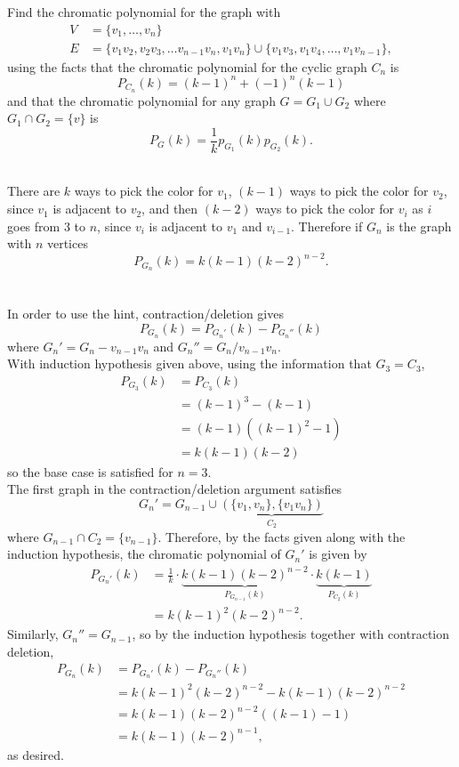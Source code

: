 \documentclass{article}
\newenvironment{problem}[2][Problem]{\begin{trivlist}
\item[\hskip \labelsep {\bfseries #1}\hskip \labelsep {\bfseries #2.}]}{\end{trivlist}}
\newenvironment{solution}[1][Solution.]{\begin{trivlist}
\item[\hskip \labelsep {\bfseries #1}]}{\end{trivlist}}
\newcommand{\set}[1]{\{ #1 \}}
\begin{document}
\begin{problem}{2}
  Find the chromatic polynomial for the graph with \begin{align*}
    V &= \set{v_1, \hdots, v_n} \\
    E &= \set{v_1 v_2, v_2v_3, \hdots v_{n-1}v_{n}, v_1v_n}
      \cup \set{v_1v_3, v_1v_4, \hdots, v_1v_{n-1}},
  \end{align*} using the facts that the chromatic polynomial for the cyclic
  graph $C_n$ is \[
    P_{C_n}(k) = (k-1)^n + (-1)^n(k-1)
  \] and that the chromatic polynomial for any graph $G = G_1 \cup G_2$ where
  $G_1 \cap G_2 = \set{v}$ is \[
    P_G(k) = \frac{1}{k}p_{G_1}(k)p_{G_2}(k).
  \]
\end{problem}

\begin{solution} \text{} \\
  There are $k$ ways
  to pick the color for $v_1$, $(k-1)$ ways to pick the color for $v_2$, since
  $v_1$ is adjacent to $v_2$, and then $(k-2)$ ways to pick the color for $v_i$
  as $i$ goes from $3$ to $n$, since $v_i$ is adjacent to $v_1$ and $v_{i-1}$.
  Therefore if $G_n$ is the graph with $n$ vertices \[
    P_{G_n}(k) = k(k-1)(k-2)^{n-2}.
  \]
  \\~\\
  In order to use the hint, contraction/deletion gives \[
    P_{G_n}(k) = P_{G_n'}(k) - P_{G_n''}(k)
  \] where $G_n' = G_n - v_{n-1}v_n$ and $G_n'' = G_n/v_{n-1}v_n$.
  \\
  With induction hypothesis given above, using the information that $G_3 = C_3$,
  \begin{align*}
    P_{G_3}(k)
    &= P_{C_3}(k) \\
    &= (k-1)^3 - (k-1) \\
    &= (k-1)((k-1)^2 - 1) \\
    &= k(k-1)(k-2)
  \end{align*} so the base case is satisfied for $n=3$.
  \\
  The first graph in the contraction/deletion argument satisfies \[
    G_n' = G_{n-1} \cup \underbrace{(\set{v_1, v_n}, \set{v_1v_n})}_{C_2}
  \] where $G_{n-1} \cap C_2 = \set{v_{n-1}}$. Therefore, by the facts given
  along with the induction hypothesis, the chromatic
  polynomial of $G_n'$ is given by \begin{align*}
    P_{G_n'}(k)
    &= \frac 1k
      \cdot \underbrace{k(k-1)(k-2)^{n-2}}_{\displaystyle P_{G_{n-1}}(k)}
      \cdot \underbrace{k(k-1)}_{\displaystyle P_{C_2}(k)} \\
    &= k(k-1)^2(k-2)^{n-2}.
  \end{align*}
  Similarly, $G_n'' = G_{n-1}$, so by the induction hypothesis together with
  contraction deletion, \begin{align*}
    P_{G_n}(k) &= P_{G_n'}(k) - P_{G_n''}(k) \\
      &= k(k-1)^2(k-2)^{n-2} - k(k-1)(k-2)^{n-2} \\
      &= k(k-1)(k-2)^{n-2} ((k-1) - 1) \\
      &= k(k-1)(k-2)^{n-1},
  \end{align*} as desired.
\end{solution}
\end{document}
